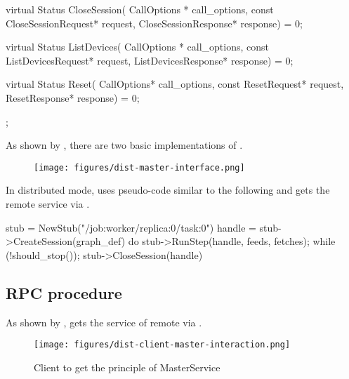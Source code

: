 \begin{content}
\begin{leftbar}
\begin{c++}
{  virtual Status CloseSession(
    CallOptions * call_options,
    const CloseSessionRequest* request,
    CloseSessionResponse* response) = 0;

  virtual Status ListDevices(
    CallOptions * call_options,
    const ListDevicesRequest* request,
    ListDevicesResponse* response) = 0;

  virtual Status Reset(
    CallOptions* call_options, const ResetRequest* request,
    ResetResponse* response) = 0;
};
\end{c++}
\end{leftbar}

As shown by , there are two basic implementations of .

\begin{enum}
\end{enum}

\begin{figure}[H]
  \centering
  \texttt{[image: figures/dist-master-interface.png]}
  \caption{}
  \label{fig:dist-master-interface}
\end{figure}

In distributed mode,  uses pseudo-code similar to the following and gets the remote  service via .

\begin{leftbar}
\begin{c++}
stub = NewStub("/job:worker/replica:0/task:0")
handle = stub->CreateSession({graph_def})
do {
  stub->RunStep(handle, feeds, fetches);
} while (!should_stop());
stub->CloseSession({handle})
\end{c++}
\end{leftbar}


\subsection{RPC procedure}
As shown by ,  gets the service of remote via .

\begin{figure}[H]
  \centering
  \texttt{[image: figures/dist-client-master-interaction.png]}
  \caption{Client to get the principle of MasterService}
  \label{fig:dist-client-master-interaction}
\end{figure}


\end{content}
